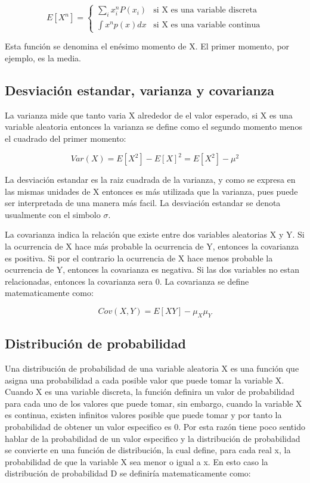 \documentclass[a4paper, 11pt, oneside]{report}
\begin{document}
	\[ E[X^n] = \left\{ \begin{array}{ll}
		\sum_{i}{x_i^nP(x_i)}   & \mbox{si X es una variable discreta} \\
		\int {x^np(x)dx} & \mbox{si X es una variable continua}
	\end{array} \right. \]

Esta función se denomina el enésimo momento de X. El primer momento, por ejemplo, es la media.

\subsection{Desviación estandar, varianza y covarianza}

La varianza mide que tanto varia X alrededor de el valor esperado, si X es una variable aleatoria entonces la varianza se define como el segundo momento menos el cuadrado del primer momento:

	\[Var(X) = E[X^2] - E[X]^2 = E[X^2] - \mu^2\]

La desviación estandar es la raiz cuadrada de la varianza, y como se expresa en las mismas unidades de X entonces es más utilizada que la varianza, pues puede ser interpretada de una manera más facil. La desviación estandar se denota usualmente con el simbolo $\sigma$.

La covarianza indica la relación que existe entre dos variables aleatorias X y Y. Si la ocurrencia de X hace más probable la ocurrencia de Y, entonces la covarianza es positiva. Si por el contrario la ocurrencia de X hace menos probable la ocurrencia de Y, entonces la covarianza es negativa. Si las dos variables no estan relacionadas, entonces la covarianza sera 0. La covarianza se define matematicamente como:

	\[Cov(X, Y) = E[XY] - \mu_X\mu_Y\]


\subsection{Distribución de probabilidad}

Una distribución de probabilidad de una variable aleatoria X es una función que asigna una probabilidad a cada posible valor que puede tomar la variable X. Cuando X es una variable discreta, la función definira un valor de probabilidad para cada uno de los valores que puede tomar, sin embargo, cuando la variable X es continua, existen infinitos valores posible que puede tomar y por tanto la probabilidad de obtener un valor especifico es 0. Por esta razón tiene poco sentido hablar de la probabilidad de un valor especifico y la distribución de probabilidad se convierte en una función de distribución, la cual define, para cada real x, la probabilidad de que la variable X sea menor o igual a x. En esto caso la distribución de probabilidad D se definiría matematicamente como:
\end{document}
